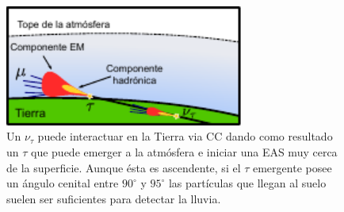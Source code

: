 \begin{figure}[ht]
\begin{center}
\includegraphics[width=0.7\textwidth]{fig/EASAuger/horizontal_es_english.pdf}
\caption{Un $\nu_{\tau}$ puede interactuar en la Tierra via CC dando como resultado un $\tau$ que puede emerger a la atmósfera e iniciar una EAS muy cerca de la superficie.
Aunque \'esta es ascendente, si el $\tau$ emergente posee un ángulo cenital entre $90^\circ$ y $95^\circ$ las partículas que llegan al suelo suelen ser suficientes para detectar la lluvia.}
\label{fig:esNu}
\end{center}
\end{figure}

